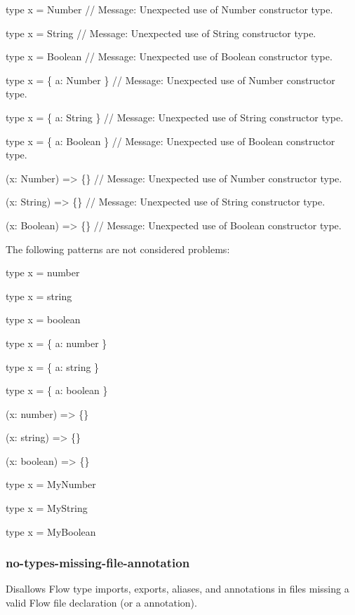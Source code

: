 \begin{DoxyCode}
type x = Number
// Message: Unexpected use of Number constructor type.

type x = String
// Message: Unexpected use of String constructor type.

type x = Boolean
// Message: Unexpected use of Boolean constructor type.

type x = \{ a: Number \}
// Message: Unexpected use of Number constructor type.

type x = \{ a: String \}
// Message: Unexpected use of String constructor type.

type x = \{ a: Boolean \}
// Message: Unexpected use of Boolean constructor type.

(x: Number) => \{\}
// Message: Unexpected use of Number constructor type.

(x: String) => \{\}
// Message: Unexpected use of String constructor type.

(x: Boolean) => \{\}
// Message: Unexpected use of Boolean constructor type.
\end{DoxyCode}


The following patterns are not considered problems\+:


\begin{DoxyCode}
type x = number

type x = string

type x = boolean

type x = \{ a: number \}

type x = \{ a: string \}

type x = \{ a: boolean \}

(x: number) => \{\}

(x: string) => \{\}

(x: boolean) => \{\}

type x = MyNumber

type x = MyString

type x = MyBoolean
\end{DoxyCode}


\label{_eslint-plugin-flowtype-rules-no-types-missing-file-annotation}%
 \subsubsection*{{\ttfamily no-\/types-\/missing-\/file-\/annotation}}

Disallows Flow type imports, exports, aliases, and annotations in files missing a valid Flow file declaration (or a  annotation).


